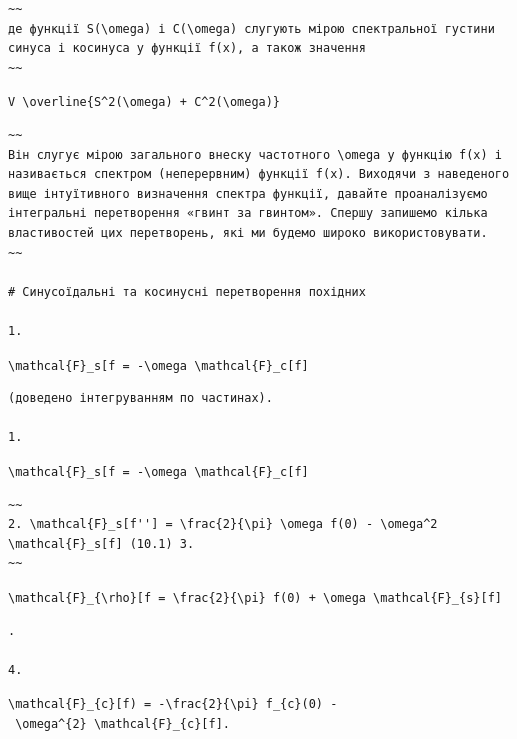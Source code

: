 \documentclass[
  ukrainian,
]{article}
\begin{document}
\begin{verbatim}
~~
де функції S(\omega) і C(\omega) слугують мірою спектральної густини синуса і косинуса у функції f(x), а також значення
~~
\end{verbatim}

\texttt{V\ \textbackslash{}overline\{S\^{}2(\textbackslash{}omega)\ +\ C\^{}2(\textbackslash{}omega)\}}

\begin{verbatim}
~~
Він слугує мірою загального внеску частотного \omega у функцію f(x) і називається спектром (неперервним) функції f(x). Виходячи з наведеного вище інтуїтивного визначення спектра функції, давайте проаналізуємо інтегральні перетворення «гвинт за гвинтом». Спершу запишемо кілька властивостей цих перетворень, які ми будемо широко використовувати.
~~

# Синусоїдальні та косинусні перетворення похідних

1.
\end{verbatim}

\texttt{\textbackslash{}mathcal\{F\}\_s{[}f\textquotesingle{}{]}\ =\ -\textbackslash{}omega\ \textbackslash{}mathcal\{F\}\_c{[}f{]}}

\begin{verbatim}
(доведено інтегруванням по частинах).

1.
\end{verbatim}

\texttt{\textbackslash{}mathcal\{F\}\_s{[}f\textquotesingle{}{]}\ =\ -\textbackslash{}omega\ \textbackslash{}mathcal\{F\}\_c{[}f{]}}

\begin{verbatim}
~~
2. \mathcal{F}_s[f''] = \frac{2}{\pi} \omega f(0) - \omega^2 \mathcal{F}_s[f] (10.1) 3.
~~
\end{verbatim}

\texttt{\textbackslash{}mathcal\{F\}\_\{\textbackslash{}rho\}{[}f\textquotesingle{}{]}\ =\ \textbackslash{}frac\{2\}\{\textbackslash{}pi\}\ f(0)\ +\ \textbackslash{}omega\ \textbackslash{}mathcal\{F\}\_\{s\}{[}f{]}}

\begin{verbatim}
.

4.
\end{verbatim}

\texttt{\textbackslash{}mathcal\{F\}\_\{c\}{[}f\textquotesingle{}\textquotesingle{})\ =\ -\textbackslash{}frac\{2\}\{\textbackslash{}pi\}\ f\_\{c\}(0)\ -\ \textbackslash{}omega\^{}\{2\}\ \textbackslash{}mathcal\{F\}\_\{c\}{[}f{]}.}
\end{document}
